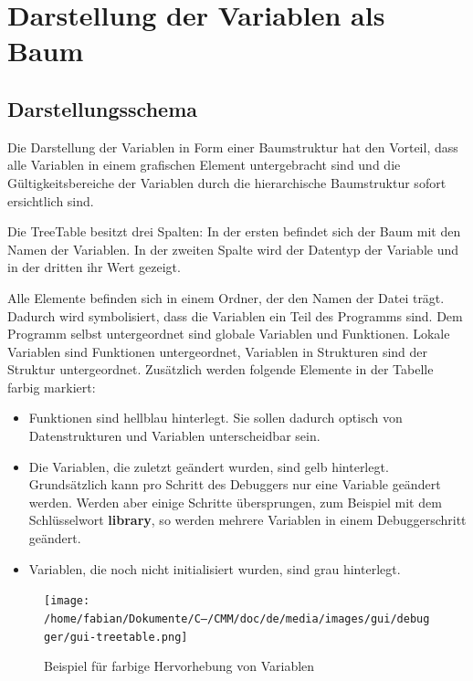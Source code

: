 \section{Darstellung der Variablen als Baum}

\subsection{Darstellungsschema}

Die Darstellung der Variablen in Form einer Baumstruktur hat den Vorteil, dass alle Variablen in einem grafischen Element untergebracht sind und die Gültigkeitsbereiche der Variablen durch die hierarchische Baumstruktur sofort ersichtlich sind.

Die TreeTable besitzt drei Spalten: In der ersten befindet sich der Baum mit den Namen der Variablen. In der zweiten Spalte wird der Datentyp der Variable und in der dritten ihr Wert gezeigt.

Alle Elemente befinden sich in einem Ordner, der den Namen der Datei trägt. Dadurch wird symbolisiert, dass die Variablen ein Teil des Programms sind. Dem Programm selbst untergeordnet sind globale Variablen und Funktionen. Lokale Variablen sind Funktionen untergeordnet, Variablen in Strukturen sind der Struktur untergeordnet.
Zusätzlich werden folgende Elemente in der Tabelle farbig markiert:
\begin{itemize}
\item Funktionen sind hellblau hinterlegt. Sie sollen dadurch optisch von Datenstrukturen und Variablen unterscheidbar sein.
\item Die Variablen, die zuletzt geändert wurden, sind gelb hinterlegt. Grundsätzlich kann pro Schritt des Debuggers nur eine Variable geändert werden. Werden aber einige Schritte übersprungen, zum Beispiel mit dem Schlüsselwort \textbf{library}, so werden mehrere Variablen in einem Debuggerschritt geändert.
\item Variablen, die noch nicht initialisiert wurden, sind grau hinterlegt.
\end{itemize}

\begin{figure}[htp]
\centering
\texttt{[image: /home/fabian/Dokumente/C--/CMM/doc/de/media/images/gui/debugger/gui-treetable.png]}
\caption{Beispiel für farbige Hervorhebung von Variablen}
\label{fig:deb-tt-example}
\end{figure}

